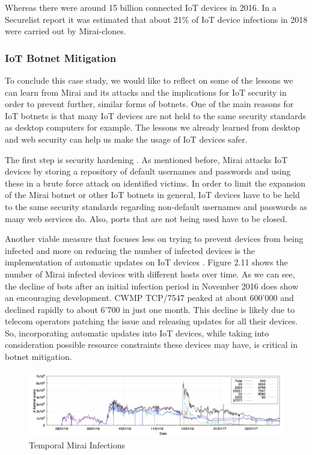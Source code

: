 Whereas there were around 15 billion connected IoT devices in 2016. \cite{Ericsson} In a Securelist report it was estimated that about 21\% of IoT device infections in 2018 were carried out by Mirai-clones. \cite{Eremin19}

\subsubsection{IoT Botnet Mitigation}
To conclude this case study, we would like to reflect on some of the lessons we can learn from Mirai and its attacks and the implications for IoT security in order to prevent further, similar forms of botnets. One of the main reasons for IoT botnets is that many IoT devices are not held to the same security standards as desktop computers for example. The lessons we already learned from desktop and web security can help us make the usage of IoT devices safer.

The first step is security hardening \cite{Antonakakis17}. As mentioned before, Mirai attacks IoT devices by storing a repository of default usernames and passwords and using these in a brute force attack on identified victims.  In order to limit the expansion of the Mirai botnet or other IoT botnets in general, IoT devices have to be held to the same security standards regarding non-default usernames and passwords as many web services do. Also, ports that are not being used have to be closed.

Another viable measure that focuses less on trying to prevent devices from being infected and more on reducing the number of infected devices is the implementation of automatic updates on IoT devices \cite{Antonakakis17}. Figure 2.11 shows the number of Mirai infected devices with different hosts over time. As we can see, the decline of bots after an initial infection period in November 2016 does show an encouraging development. CWMP TCP/7547 peaked at about 600'000 and declined rapidly to about 6'700 in just one month. This decline is likely due to telecom operators patching the issue and releasing updates for all their devices. So, incorporating automatic updates into IoT devices, while taking into consideration possible resource constraints these devices may have, is critical in botnet mitigation.

\begin{figure}[ht]
\begin{center} \includegraphics[scale=0.5]{Talk11/MiraiInfections} \end{center}
\caption{Temporal Mirai Infections \cite{Antonakakis17}}
\label{label}
\end{figure}

